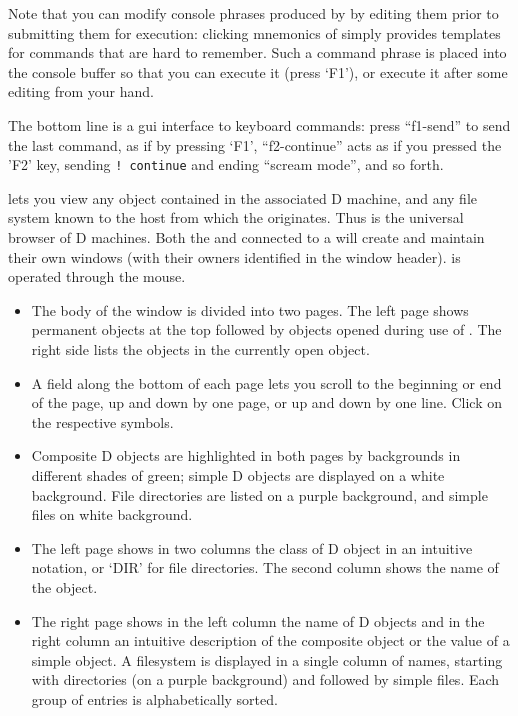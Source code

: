 \begin{description}
  Note that you can modify console phrases
  produced by  by editing them prior to submitting
  them for execution: clicking mnemonics of  simply
  provides templates for commands that are hard to remember. Such a
  command phrase is placed into the console buffer so that you can
  execute it (press `F1'), or execute it after some editing from your
  hand.

  The bottom line is a gui interface to keyboard commands: press
  ``f1-send'' to send the last command, as if by pressing `F1',
  ``f2-continue'' acts as if you pressed the 'F2' key, sending
  \texttt{!}~\texttt{continue} and ending ``scream mode'', and so forth.

\item[\win{TheEye}] lets you view any object contained in the
  associated D machine, and any file system known to the host from
  which the  originates. Thus  is the
  universal browser of D machines. Both the  and
   connected to a  will create and
  maintain their own  windows (with their owners
  identified in the window header).  is operated through
  the mouse.

  \begin{itemize}
  \item The body of the window is divided into two pages. The left
    page shows permanent objects at the top followed by objects opened
    during use of . The right side lists the objects in
    the currently open object.

  \item A field along the bottom of each page lets you scroll to the
    beginning or end of the page, up and down by one page, or up and
    down by one line. Click on the respective symbols.

  \item Composite D objects are highlighted in both pages by
    backgrounds in different shades of green; simple D objects are
    displayed on a white background. File directories are listed on a
    purple background, and simple files on white background.

  \item The left page shows in two columns the class of D object in an
    intuitive notation, or `DIR' for file directories. The second
    column shows the name of the object.

  \item The right page shows in the left column the name of D objects
    and in the right column an intuitive description of the composite
    object or the value of a simple object. A filesystem is displayed
    in a single column of names, starting with directories (on a
    purple background) and followed by simple files. Each group of
    entries is alphabetically sorted.


\end{itemize}
\end{description}

